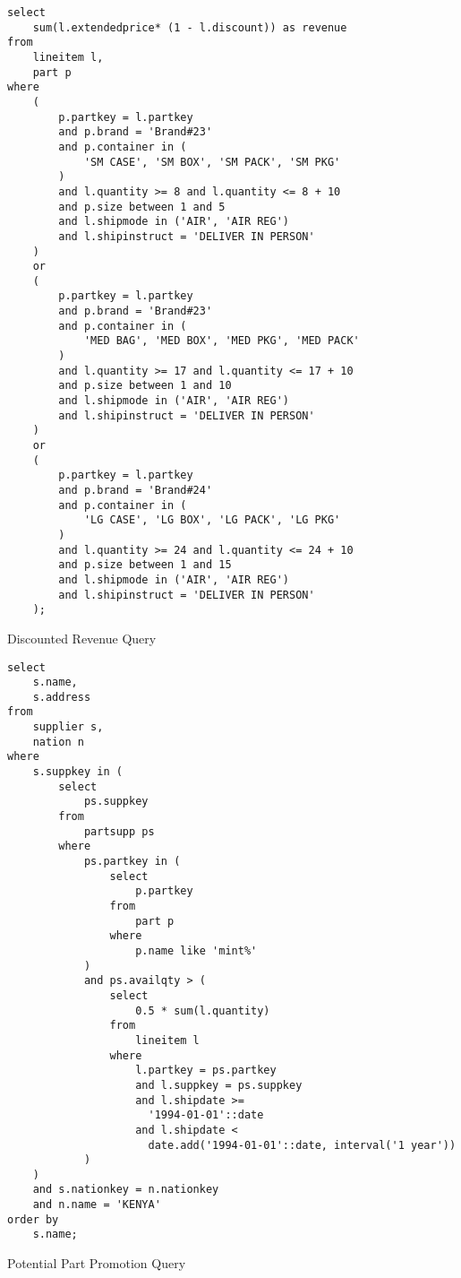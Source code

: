 \begin{listing}[!ht]
\begin{verbatim}
select
    sum(l.extendedprice* (1 - l.discount)) as revenue
from
    lineitem l,
    part p
where
    (
        p.partkey = l.partkey
        and p.brand = 'Brand#23'
        and p.container in (
            'SM CASE', 'SM BOX', 'SM PACK', 'SM PKG'
        )
        and l.quantity >= 8 and l.quantity <= 8 + 10
        and p.size between 1 and 5
        and l.shipmode in ('AIR', 'AIR REG')
        and l.shipinstruct = 'DELIVER IN PERSON'
    )
    or
    (
        p.partkey = l.partkey
        and p.brand = 'Brand#23'
        and p.container in (
            'MED BAG', 'MED BOX', 'MED PKG', 'MED PACK'
        )
        and l.quantity >= 17 and l.quantity <= 17 + 10
        and p.size between 1 and 10
        and l.shipmode in ('AIR', 'AIR REG')
        and l.shipinstruct = 'DELIVER IN PERSON'
    )
    or
    (
        p.partkey = l.partkey
        and p.brand = 'Brand#24'
        and p.container in (
            'LG CASE', 'LG BOX', 'LG PACK', 'LG PKG'
        )
        and l.quantity >= 24 and l.quantity <= 24 + 10
        and p.size between 1 and 15
        and l.shipmode in ('AIR', 'AIR REG')
        and l.shipinstruct = 'DELIVER IN PERSON'
    );
\end{verbatim}
\caption{Discounted Revenue Query}
\end{listing}

\begin{listing}[!ht]
\begin{verbatim}
select
    s.name,
    s.address
from
    supplier s,
    nation n
where
    s.suppkey in (
        select
            ps.suppkey
        from
            partsupp ps
        where
            ps.partkey in (
                select
                    p.partkey
                from
                    part p
                where
                    p.name like 'mint%'
            )
            and ps.availqty > (
                select
                    0.5 * sum(l.quantity)
                from
                    lineitem l
                where
                    l.partkey = ps.partkey
                    and l.suppkey = ps.suppkey
                    and l.shipdate >=
                      '1994-01-01'::date
                    and l.shipdate <
                      date.add('1994-01-01'::date, interval('1 year'))
            )
    )
    and s.nationkey = n.nationkey
    and n.name = 'KENYA'
order by
    s.name;
\end{verbatim}
\caption{Potential Part Promotion Query}
\end{listing}

